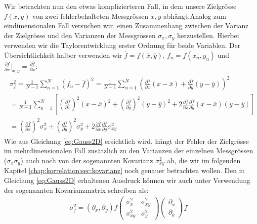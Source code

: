 Wir betrachten nun den etwas komplizierteren Fall, in dem unsere Zielgrösse $f(x,y)$ von zwei fehlerbehafteten Messgrössen $x, y$ abhängt.Analog zum eindimensionalen Fall versuchen wir, einen Zusammenhang zwischen der Varianz der Zielgrösse und den Varianzen der Messgrössen $\sigma_x, \sigma_y$ herzustellen. Hierbei verwenden wir die Taylorentwicklung erster Ordnung für beide Variablen. Der Übersichtlichkeit halber verwenden wir $\overline{f} = f(\overline{x}, \overline{y})$, $f_n = f(x_n, y_n)$ und $\frac{\partial f}{\partial x}\bigg|_{\overline{x}, \overline{y}} = \frac{\partial \overline{f}}{\partial x}$:
\begin{align}
\begin{split}
\sigma_f^2 = \frac{1}{N-1} \sum_{n=1}^N (f_n - \overline{f})^2 = \frac{1}{N-1}\sum_{n=1}^N \left( \frac{\partial \overline{f}}{\partial x} (x - \overline{x}) + \frac{\partial \overline{f}}{\partial y} (y - \overline{y})\right)^2  \\
=  \frac{1}{N-1}\sum_{n=1}^N \left[ \left(\frac{\partial \overline{f}}{\partial x}\right)^2 (x - \overline{x})^2 + \left(\frac{\partial \overline{f}}{\partial y}\right)^2 (y - \overline{y})^2 + 2\frac{\partial \overline{f}}{\partial x}\frac{\partial \overline{f}}{\partial y}(x - \overline{x})(y - \overline{y})\right] \\
= \left(\frac{\partial \overline{f}}{\partial x}\right)^2\sigma_x^2 +  \left(\frac{\partial \overline{f}}{\partial y}\right)^2\sigma_y^2 + 2\frac{\partial \overline{f}}{\partial x}\frac{\partial \overline{f}}{\partial y}\sigma_{xy}^2
\end{split}
\label{eq:Gauss2D}
\end{align}
Wie aus Gleichung \ref{eq:Gauss2D} ersichtlich wird, hängt der Fehler der Zielgrösse im mehrdimensionalen Fall zusätzlich zu den Varianzen der einzelnen Messgrössen ($\sigma_x\sigma_y$) auch noch von der sogenannten Kovarianz $\sigma_{xy}^2$ ab, die wir im folgenden Kapitel \ref{chap:korrelation:sec:kovarianz} noch genauer betrachten wollen. Den in Gleichung \ref{eq:Gauss2D} erhaltenen Ausdruck können wir auch unter Verwendung der sogenannten Kovarianzmatrix schreiben als:
\begin{align}
\sigma_f^2 = (\partial_x, \partial_y)f \begin{pmatrix}
\sigma_x^2 & \sigma_{xy}^2 \\
\sigma_{xy}^2 & \sigma_y^2 
\end{pmatrix} \begin{pmatrix}
\partial_x \\
\partial_y 
\end{pmatrix} f
\end{align}
